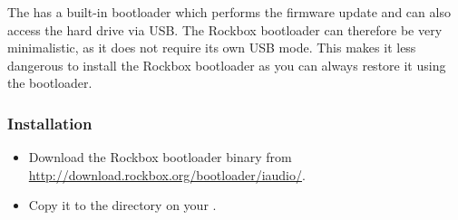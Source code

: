 The \playername{} has a built-in bootloader which performs the
firmware update and can also access the hard drive via USB.  The
Rockbox bootloader can therefore be very minimalistic, as it does not require
 its own USB mode.  This makes it less dangerous to install the Rockbox bootloader
 as you can always restore it using the \playerman{} bootloader.


\subsubsection{Installation}
\begin{itemize}
\item Download the Rockbox bootloader binary from 
\url{http://download.rockbox.org/bootloader/iaudio/}.
\item Copy it to the  directory on your \dap{}.
\end{itemize}
